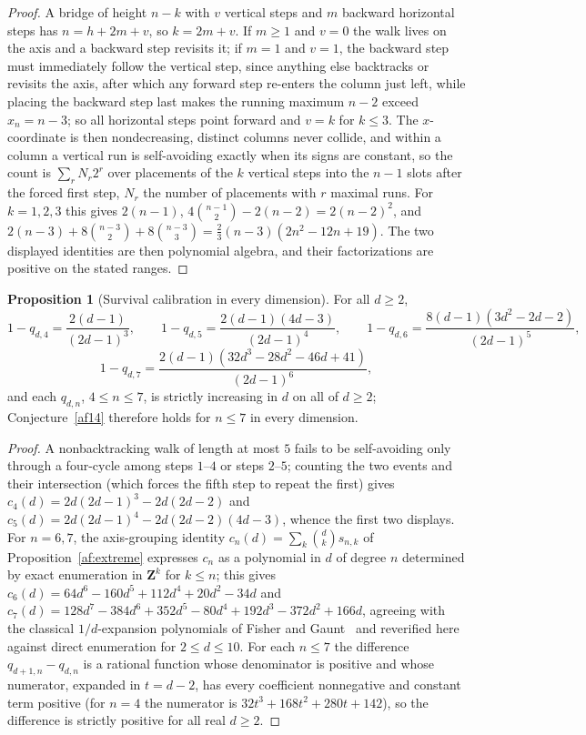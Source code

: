 \documentclass[11pt]{article}
\theoremstyle{definition}
\newtheorem{proposition}{Proposition}
\begin{document}
\begin{proof}
A bridge of height $n-k$ with $v$ vertical steps and $m$ backward horizontal steps has $n=h+2m+v$, so $k=2m+v$.  If $m\ge1$ and $v=0$ the walk lives on the axis and a backward step revisits it; if $m=1$ and $v=1$, the backward step must immediately follow the vertical step, since anything else backtracks or revisits the axis, after which any forward step re-enters the column just left, while placing the backward step last makes the running maximum $n-2$ exceed $x_n=n-3$; so all horizontal steps point forward and $v=k$ for $k\le3$.  The $x$-coordinate is then nondecreasing, distinct columns never collide, and within a column a vertical run is self-avoiding exactly when its signs are constant, so the count is $\sum_r N_r2^r$ over placements of the $k$ vertical steps into the $n-1$ slots after the forced first step, $N_r$ the number of placements with $r$ maximal runs.  For $k=1,2,3$ this gives $2(n-1)$, $4\binom{n-1}2-2(n-2)=2(n-2)^2$, and $2(n-3)+8\binom{n-3}2+8\binom{n-3}3=\tfrac23(n-3)(2n^2-12n+19)$.  The two displayed identities are then polynomial algebra, and their factorizations are positive on the stated ranges.
\end{proof}

\begin{proposition}[Survival calibration in every dimension]\label{af:nbw}
For all $d\ge2$,
\[
1-q_{d,4}=\frac{2(d-1)}{(2d-1)^3},\qquad
1-q_{d,5}=\frac{2(d-1)(4d-3)}{(2d-1)^4},\qquad
1-q_{d,6}=\frac{8(d-1)(3d^2-2d-2)}{(2d-1)^5},
\]
\[
1-q_{d,7}=\frac{2(d-1)(32d^3-28d^2-46d+41)}{(2d-1)^6},
\]
and each $q_{d,n}$, $4\le n\le7$, is strictly increasing in $d$ on all of $d\ge2$; Conjecture~\ref{af14} therefore holds for $n\le7$ in every dimension.
\end{proposition}

\begin{proof}
A nonbacktracking walk of length at most $5$ fails to be self-avoiding only through a four-cycle among steps $1$--$4$ or steps $2$--$5$; counting the two events and their intersection (which forces the fifth step to repeat the first) gives $c_4(d)=2d(2d-1)^3-2d(2d-2)$ and $c_5(d)=2d(2d-1)^4-2d(2d-2)(4d-3)$, whence the first two displays.  For $n=6,7$, the axis-grouping identity $c_n(d)=\sum_k\binom dk s_{n,k}$ of Proposition~\ref{af:extreme} expresses $c_n$ as a polynomial in $d$ of degree $n$ determined by exact enumeration in $\mathbf Z^k$ for $k\le n$; this gives $c_6(d)=64d^6-160d^5+112d^4+20d^2-34d$ and $c_7(d)=128d^7-384d^6+352d^5-80d^4+192d^3-372d^2+166d$, agreeing with the classical $1/d$-expansion polynomials of Fisher and Gaunt~\cite{FG64} and reverified here against direct enumeration for $2\le d\le10$.  For each $n\le7$ the difference $q_{d+1,n}-q_{d,n}$ is a rational function whose denominator is positive and whose numerator, expanded in $t=d-2$, has every coefficient nonnegative and constant term positive (for $n=4$ the numerator is $32t^3+168t^2+280t+142$), so the difference is strictly positive for all real $d\ge2$.
\end{proof}
\end{document}
